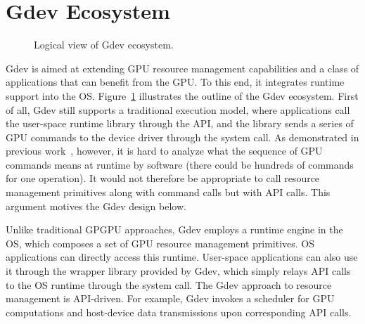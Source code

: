 \section{Gdev Ecosystem}
\label{sec:ecosystem}

\begin{figure}[t]
 \begin{center}
  \caption{Logical view of Gdev ecosystem.}
  \label{fig:gdev}
 \end{center}
 \vspace{-1em}
\end{figure}

Gdev is aimed at extending GPU resource management capabilities and a
class of applications that can benefit from the GPU.
To this end, it integrates runtime support into the OS.
Figure~\ref{fig:gdev} illustrates the outline of the Gdev ecosystem.
First of all, Gdev still supports a traditional execution model, where
applications call the user-space runtime library through the API, and
the library sends a series of GPU commands to the device driver through
the system call.
As demonstrated in previous work~\cite{Kato_ATC11}, however, it is hard
to analyze what the sequence of GPU commands means at runtime by
software (there could be hundreds of commands for one operation).
It would not therefore be appropriate to call resource management
primitives along with command calls but with API calls.
This argument motives the Gdev design below.

Unlike traditional GPGPU approaches, Gdev employs a runtime engine in
the OS, which composes a set of GPU resource management primitives.
OS applications can directly access this runtime.
User-space applications can also use it through the wrapper library provided by
Gdev, which simply relays API calls to the OS runtime through the system
call.
The Gdev approach to resource management is API-driven.
For example, Gdev invokes a scheduler for GPU computations and
host-device data transmissions upon corresponding API calls.

